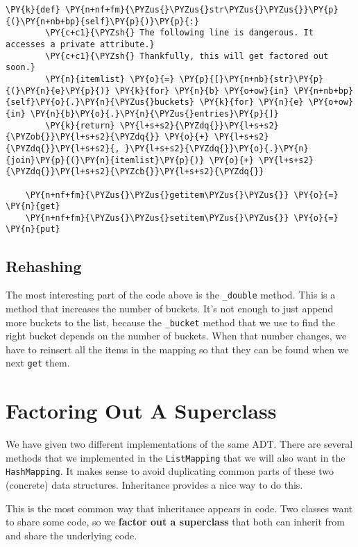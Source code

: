 \begin{Verbatim}[commandchars=\\\{\}]
    \PY{k}{def} \PY{n+nf+fm}{\PYZus{}\PYZus{}str\PYZus{}\PYZus{}}\PY{p}{(}\PY{n+nb+bp}{self}\PY{p}{)}\PY{p}{:}
        \PY{c+c1}{\PYZsh{} The following line is dangerous. It accesses a private attribute.}
        \PY{c+c1}{\PYZsh{} Thankfully, this will get factored out soon.}
        \PY{n}{itemlist} \PY{o}{=} \PY{p}{[}\PY{n+nb}{str}\PY{p}{(}\PY{n}{e}\PY{p}{)} \PY{k}{for} \PY{n}{b} \PY{o+ow}{in} \PY{n+nb+bp}{self}\PY{o}{.}\PY{n}{\PYZus{}buckets} \PY{k}{for} \PY{n}{e} \PY{o+ow}{in} \PY{n}{b}\PY{o}{.}\PY{n}{\PYZus{}entries}\PY{p}{]}
        \PY{k}{return} \PY{l+s+s2}{\PYZdq{}}\PY{l+s+s2}{\PYZob{}}\PY{l+s+s2}{\PYZdq{}} \PY{o}{+} \PY{l+s+s2}{\PYZdq{}}\PY{l+s+s2}{, }\PY{l+s+s2}{\PYZdq{}}\PY{o}{.}\PY{n}{join}\PY{p}{(}\PY{n}{itemlist}\PY{p}{)} \PY{o}{+} \PY{l+s+s2}{\PYZdq{}}\PY{l+s+s2}{\PYZcb{}}\PY{l+s+s2}{\PYZdq{}}

    \PY{n+nf+fm}{\PYZus{}\PYZus{}getitem\PYZus{}\PYZus{}} \PY{o}{=} \PY{n}{get}
    \PY{n+nf+fm}{\PYZus{}\PYZus{}setitem\PYZus{}\PYZus{}} \PY{o}{=} \PY{n}{put}
\end{Verbatim}


\subsection{Rehashing}


The most interesting part of the code above is the \texttt{\_double} method.  This is a method that increases the number of buckets.  It's not enough to just append more buckets to the list, because the \texttt{\_bucket} method that we use to find the right bucket depends on the number of buckets.  When that number changes, we have to reinsert all the items in the mapping so that they can be found when we next \texttt{get} them.  

\section{Factoring Out A Superclass}


We have given two different implementations of the same ADT.  There are several methods that we implemented in the \texttt{ListMapping} that we will also want in the \texttt{HashMapping}.  It makes sense to avoid duplicating common parts of these two (concrete) data structures.  Inheritance provides a nice way to do this.


This is the most common way that inheritance appears in code.  Two classes want to share some code, so we \textbf{factor out a superclass} that both can inherit from and share the underlying code.


